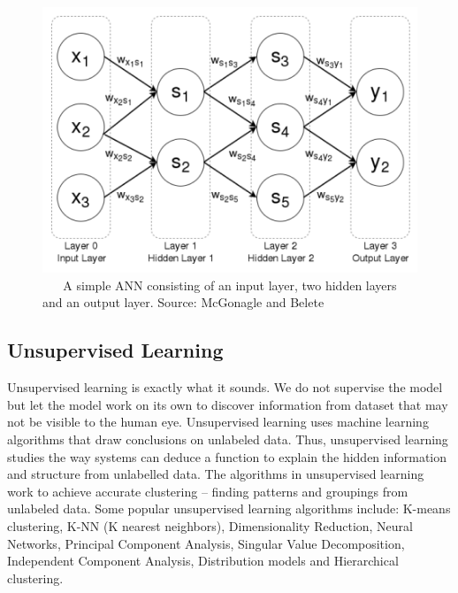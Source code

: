 \documentclass[master]{thesis-uestc}
\begin{document}
\begin{figure}[ht]
\includegraphics[width=5in]{pic/ANN.png}
\caption{\,\,\,\,\,\,\,\,\,\,A simple ANN consisting of an input layer, two hidden layers and an output layer. Source: McGonagle and Belete\cite{McGonagle}}
\label{fig_ANN}
\end{figure}

\subsection{Unsupervised Learning}
Unsupervised learning is exactly what it sounds. We do not supervise the model but let the model work on its own to discover information from dataset that may not be visible to the human eye. Unsupervised learning uses machine learning algorithms that draw conclusions on unlabeled data. Thus, unsupervised learning studies the way systems can deduce a function to explain the hidden information and structure from unlabelled data. The algorithms in unsupervised learning work to achieve accurate clustering – finding patterns and groupings from unlabeled data. Some popular unsupervised learning algorithms include: K-means clustering, K-NN (K nearest neighbors), Dimensionality Reduction, Neural Networks, Principal Component Analysis, Singular Value Decomposition, Independent Component Analysis, Distribution models and Hierarchical clustering.
\end{document}
